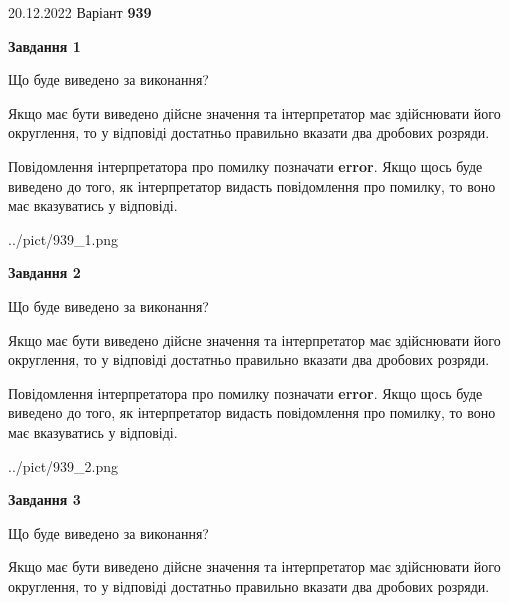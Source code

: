 \documentclass[12pt, ukrainian]{article}
\begin{document}
{20.12.2022 Варіант \No \textbf { 939 }\par}
{
\begin {Large}

{\begin {center}\textbf{Завдання 1}\end {center}}\par
Що буде виведено за виконання? \par

Якщо має бути виведено дійсне значення та інтерпретатор має здійснювати його округлення, 
то у відповіді достатньо правильно вказати два дробових розряди.

Повідомлення інтерпретатора про помилку позначати \textbf{error}.
Якщо щось буде виведено до того, як інтерпретатор видасть повідомлення про помилку, 
то воно має вказуватись у відповіді. \par

\begin{center}
	{../pict/939_1.png}
\end{center}
\newpage

{\begin {center}\textbf{Завдання 2}\end {center}}\par
Що буде виведено за виконання? \par

Якщо має бути виведено дійсне значення та інтерпретатор має здійснювати його округлення, 
то у відповіді достатньо правильно вказати два дробових розряди.

Повідомлення інтерпретатора про помилку позначати \textbf{error}.
Якщо щось буде виведено до того, як інтерпретатор видасть повідомлення про помилку, 
то воно має вказуватись у відповіді. \par

\begin{center}
	{../pict/939_2.png}
\end{center}
\newpage

{\begin {center}\textbf{Завдання 3}\end {center}}\par
Що буде виведено за виконання? \par

Якщо має бути виведено дійсне значення та інтерпретатор має здійснювати його округлення, 
то у відповіді достатньо правильно вказати два дробових розряди.


\end{Large}}
\end{document}
